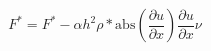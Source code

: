 \documentclass{article}
\title{}
\author{Brooks Karlik}
\date{\today}
\newcommand{\pd}[2]{\frac{\partial #1}{\partial #2}}
\newcommand{\abs}{\text{abs}}
\begin{document}
\maketitle
\newpage


$$
	F^*
	= 
	F^* 
	- 
	\alpha h^2 \rho* \abs
	\left(
		\pd{u}{x}
	\right)
	\pd{u}{x}
	\nu
$$
\end{document}
